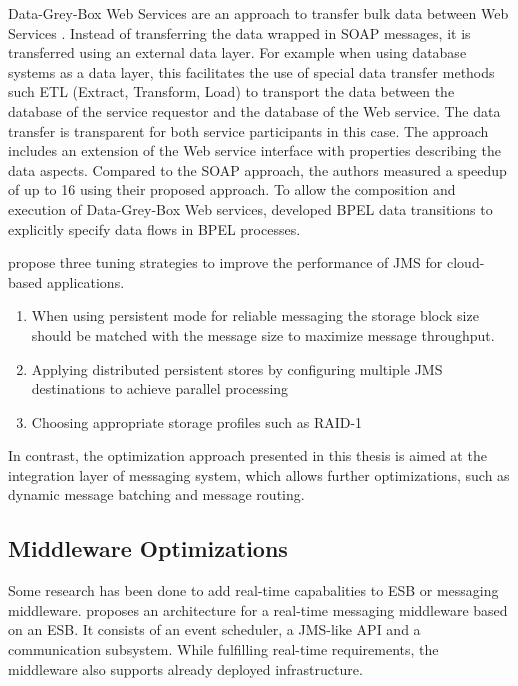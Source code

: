 Data-Grey-Box Web Services are an approach to transfer bulk data between Web Services \citep{Habich:2007ij}. Instead of transferring the data wrapped in SOAP messages, it is transferred using an external data layer. For example when using database systems as a data layer, this facilitates the use of special data transfer methods such ETL (Extract, Transform, Load) to transport the data between the database of the service requestor and the database of the Web service. The data transfer is transparent for both service participants in this case. The approach includes an extension of the Web service interface with properties describing the data aspects. Compared to the SOAP approach, the authors measured a speedup of up to 16 using their proposed approach. To allow the composition and execution of Data-Grey-Box Web services,  \citet{Habich:kl} developed BPEL data transitions to explicitly specify data flows in BPEL processes.

\cite{Zhuang:2012qf} propose three tuning strategies to improve the performance of \ac{JMS} for cloud-based applications.
\begin{enumerate}
	\item When using persistent mode for reliable messaging the storage block size should be matched with the message size to maximize message throughput.
	\item Applying distributed persistent stores by configuring multiple JMS destinations to achieve parallel processing
	\item Choosing appropriate storage profiles such as RAID-1
\end{enumerate}

In contrast, the optimization approach presented in this thesis is aimed at the integration layer of messaging system, which allows further optimizations, such as dynamic message batching and message routing.

\subsection{Middleware Optimizations}

Some research has been done to add real-time capabalities to \ac{ESB} or messaging middleware. \cite{Garces-Erice:2009kx} proposes an architecture for a real-time messaging middleware based on an \ac{ESB}. It consists of an event scheduler, a \ac{JMS}-like API and a communication subsystem. While fulfilling real-time requirements, the middleware also supports already deployed infrastructure.

